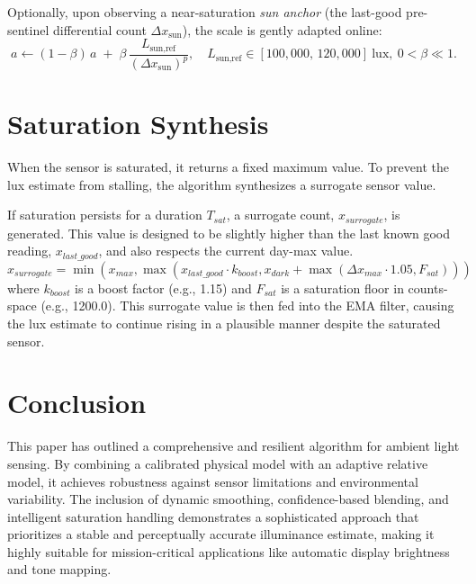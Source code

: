 \documentclass{article}
\begin{document}
Optionally, upon observing a near-saturation \emph{sun anchor} (the last-good pre-sentinel differential count $\Delta x_{\text{sun}}$), the scale is gently adapted online:
\begin{equation}
    a \leftarrow (1-\beta)\,a\; +\; \beta\,\frac{L_{\text{sun,ref}}}{(\Delta x_{\text{sun}})^{p}},\quad L_{\text{sun,ref}} \in [100{,}000,\,120{,}000]\ \mathrm{lux},\ 0<\beta\ll 1.
\end{equation}

\section{Saturation Synthesis}
When the sensor is saturated, it returns a fixed maximum value. To prevent the lux estimate from stalling, the algorithm synthesizes a surrogate sensor value.

If saturation persists for a duration $T_{sat}$, a surrogate count, $x_{surrogate}$, is generated. This value is designed to be slightly higher than the last known good reading, $x_{last\_good}$, and also respects the current day-max value.
\begin{equation}
    x_{surrogate} = \min\left(x_{max}, \max(x_{last\_good} \cdot k_{boost}, x_{dark} + \max(\Delta x_{max} \cdot 1.05, F_{sat}))\right)
\end{equation}
where $k_{boost}$ is a boost factor (e.g., 1.15) and $F_{sat}$ is a saturation floor in counts-space (e.g., 1200.0). This surrogate value is then fed into the EMA filter, causing the lux estimate to continue rising in a plausible manner despite the saturated sensor.

\section{Conclusion}
This paper has outlined a comprehensive and resilient algorithm for ambient light sensing. By combining a calibrated physical model with an adaptive relative model, it achieves robustness against sensor limitations and environmental variability. The inclusion of dynamic smoothing, confidence-based blending, and intelligent saturation handling demonstrates a sophisticated approach that prioritizes a stable and perceptually accurate illuminance estimate, making it highly suitable for mission-critical applications like automatic display brightness and tone mapping.
\end{document}
